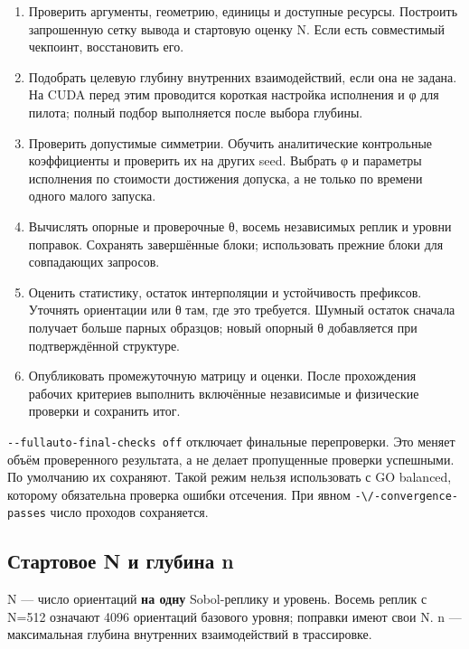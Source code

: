 \begin{enumerate}
\def\labelenumi{\arabic{enumi}.}
\tightlist
\item
  Проверить аргументы, геометрию, единицы и доступные ресурсы. Построить
  запрошенную сетку вывода и стартовую оценку N. Если есть совместимый
  чекпоинт, восстановить его.
\item
  Подобрать целевую глубину внутренних взаимодействий, если она не
  задана. На CUDA перед этим проводится короткая настройка исполнения и
  φ для пилота; полный подбор выполняется после выбора глубины.
\item
  Проверить допустимые симметрии. Обучить аналитические контрольные
  коэффициенты и проверить их на других seed. Выбрать φ и параметры
  исполнения по стоимости достижения допуска, а не только по времени
  одного малого запуска.
\item
  Вычислять опорные и проверочные θ, восемь независимых реплик и уровни
  поправок. Сохранять завершённые блоки; использовать прежние блоки для
  совпадающих запросов.
\item
  Оценить статистику, остаток интерполяции и устойчивость префиксов.
  Уточнять ориентации или θ там, где это требуется. Шумный остаток
  сначала получает больше парных образцов; новый опорный θ добавляется
  при подтверждённой структуре.
\item
  Опубликовать промежуточную матрицу и оценки. После прохождения рабочих
  критериев выполнить включённые независимые и физические проверки и
  сохранить итог.
\end{enumerate}

\texttt{-\/-fullauto-final-checks\ off} отключает финальные
перепроверки. Это меняет объём проверенного результата, а не делает
пропущенные проверки успешными. По умолчанию их сохраняют. Такой режим
нельзя использовать с GO balanced, которому обязательна проверка ошибки
отсечения. При явном \nolinkurl{-\/-convergence-passes} число проходов
сохраняется.

\subsection{Стартовое N и глубина
n}\label{ux441ux442ux430ux440ux442ux43eux432ux43eux435-n-ux438-ux433ux43bux443ux431ux438ux43dux430-n}

N --- число ориентаций \textbf{на одну} Sobol-реплику и уровень. Восемь
реплик с N=512 означают 4096 ориентаций базового уровня; поправки имеют
свои N. n --- максимальная глубина внутренних взаимодействий в
трассировке.

